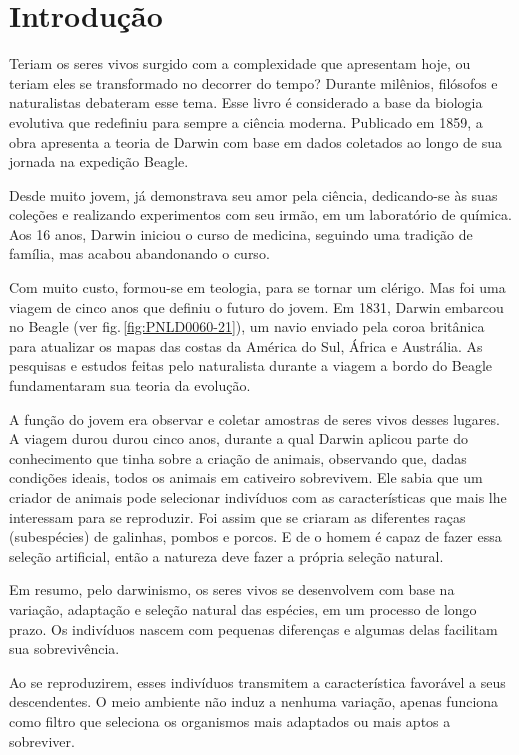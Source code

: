 \documentclass[11pt]{extarticle}
\begin{document}
\tableofcontents

\section{Introdução}

Teriam os seres vivos surgido com a complexidade que apresentam hoje, ou teriam
eles se transformado no decorrer do tempo?
Durante milênios, filósofos e naturalistas debateram esse tema.
Esse livro é considerado a base da biologia evolutiva que redefiniu para sempre
a ciência moderna. Publicado em 1859, a obra apresenta a teoria de Darwin com base em dados coletados ao longo de sua jornada na expedição Beagle. 


Desde muito jovem, já demonstrava seu amor pela ciência, dedicando-se às suas
coleções e realizando experimentos com seu irmão, em um laboratório de
química. Aos 16 anos, Darwin iniciou o curso de medicina,  seguindo uma tradição de família, mas acabou abandonando o curso.

Com muito custo, formou-se em teologia, para se tornar um clérigo.  Mas foi uma
viagem de cinco anos que definiu o futuro do jovem.  Em 1831, Darwin embarcou
no Beagle (ver fig.\,\ref{fig:PNLD0060-21}), um navio enviado pela coroa britânica para atualizar os mapas das costas da América do Sul,  África e Austrália.
As pesquisas e estudos feitas pelo naturalista durante a viagem a bordo do
Beagle fundamentaram sua teoria da evolução.


A função do jovem era observar e coletar amostras de seres vivos desses
lugares. A viagem durou 
durou cinco anos, durante a qual Darwin aplicou parte do conhecimento que tinha sobre a criação de animais, observando que, dadas condições ideais, todos os animais em cativeiro
sobrevivem. Ele sabia que um criador de animais pode selecionar indivíduos com as características que mais lhe interessam para se reproduzir.
Foi assim que se criaram as diferentes raças (subespécies) de galinhas, pombos
e porcos. E de o homem é capaz de fazer essa seleção artificial, então a natureza deve fazer a própria seleção natural.

Em resumo, pelo darwinismo, os seres vivos se desenvolvem com base na variação,
adaptação e seleção natural das espécies, em um processo de longo prazo.
Os indivíduos nascem com pequenas diferenças e algumas delas facilitam sua
sobrevivência.

Ao se reproduzirem, esses indivíduos transmitem a característica favorável
a seus descendentes. O meio ambiente não induz a nenhuma variação, apenas funciona como filtro que
seleciona os organismos mais adaptados ou mais aptos a sobreviver.
\end{document}
